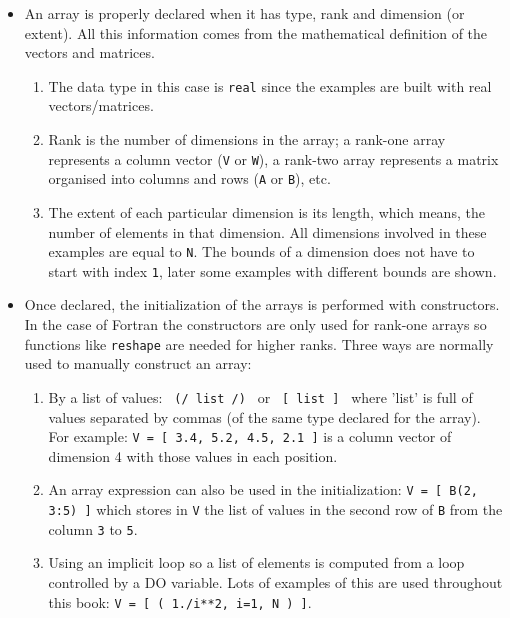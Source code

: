 \begin{itemize}
    \item An array is properly declared when it has type, rank and dimension (or extent). 
    All this information comes from the mathematical definition of the vectors and matrices.
    
    \begin{enumerate}
        \item The data type in this case is \texttt{real} since the examples are built with real vectors/matrices. 
        \item Rank is the number of dimensions in the array; a rank-one array represents a column vector (\texttt{V} or \texttt{W}), a rank-two array represents a matrix organised into columns and rows (\texttt{A} or \texttt{B}), etc. 
        \item The extent of each particular dimension is its length, which means, the number of elements in that dimension. All dimensions involved in these examples are equal to \texttt{N}. The bounds of a dimension does not have to start with index \texttt{1}, later some examples with different bounds are shown. 
    \end{enumerate}

    \item Once declared, the initialization of the arrays is performed with constructors. In the case of Fortran the constructors are only used for rank-one arrays so functions like \texttt{reshape} are needed for higher ranks. Three ways are normally used to manually construct an array:
    
    \begin{enumerate}
        \item By a list of values: \texttt{ (/ list /) } or \texttt{ [ list ] } where 'list' is full of values separated by commas (of the same type declared for the array). For example: \texttt{V = [ 3.4, 5.2, 4.5, 2.1 ]} is a column vector of dimension 4 with those values in each position.
        \item An array expression can also be used in the initialization: \texttt{V = [ B(2, 3:5) ]} which stores in \texttt{V} the list of values in the second row of \texttt{B} from the column \texttt{3} to \texttt{5}.
        \item Using an implicit loop so a list of elements is computed from a loop controlled by a DO variable. Lots of examples of this are used throughout this book: \texttt{V = [ ( 1./i**2, i=1, N ) ]}.
    \end{enumerate}


\end{itemize}
